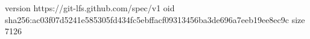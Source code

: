 version https://git-lfs.github.com/spec/v1
oid sha256:ac03f07d5241e585305fd434fc5ebffacf09313456ba3de696a7eeb19ee8ec9c
size 7126
